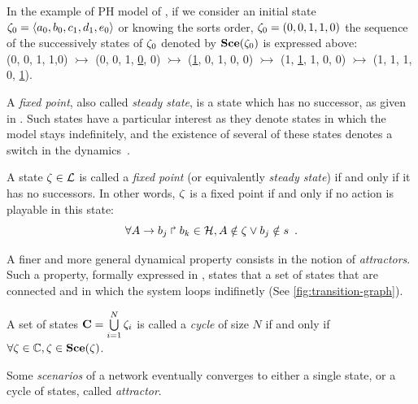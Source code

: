 In the example of PH model of , if we consider an initial state $\zeta_0 = \mbox{$\langle a_0, b_0, c_1, d_1, e_0 \rangle$}$ or knowing the sorts order, $\zeta_0 = (0, 0, 1, 1, 0)$ the sequence of the successively states of $\zeta_0$ denoted by $\mathbf{Sce}(\zeta_0)$ is expressed above: \\
(0, 0, 1, 1,0) $\rightarrowtail$ (0, 0, 1, \underline{0}, 0) $\rightarrowtail $ (\underline{1}, 0, 1, 0, 0) $\rightarrowtail$ (1, \underline{1}, 1, 0, 0) $\rightarrowtail$ (1, 1, 1, 0, \underline{1}). 

A \emph{fixed point}, also called \emph{steady state},
is a state which has no successor,
as given in .
Such states have a particular interest as they denote states in which the model
stays indefinitely,
and the existence of several of these states denotes a switch in the dynamics~\cite{wuensche1998genomic}.

\begin{definition}
\label{def:fixpoint}
  A state $\zeta \in \mathcal{L}$ is called a \emph{fixed point}
  (or equivalently \emph{steady state})
  if and only if it has no successors.
  In other words, $\zeta$ is a fixed point if and only if no action is playable in this state:
$$ \forall A\rightarrow b_j\Rsh b_k \in \mathcal{H}, A \notin \zeta \vee b_j \notin s \enspace. $$
\end{definition}

A finer and more general dynamical property consists in
the notion of \emph{attractors}.
Such a property, formally expressed in ,
states that a set of states that are connected and in which the system loops indifinetly (See \ref{fig:transition-graph}). \\


\begin{definition}
\label{def:cycle}
A set of states $\mathbf{C} = \bigcup\limits_{i=1}^{N} \zeta_{i}$ is called a \emph{cycle} of size $N$ if and only if $\forall \zeta \in \mathbb{C}, \zeta \in \mathbf{Sce}(\zeta) $.
\end{definition}

Some \emph{scenarios} of a network eventually converges to either a single state, or a cycle of states, called \emph{attractor}. 

